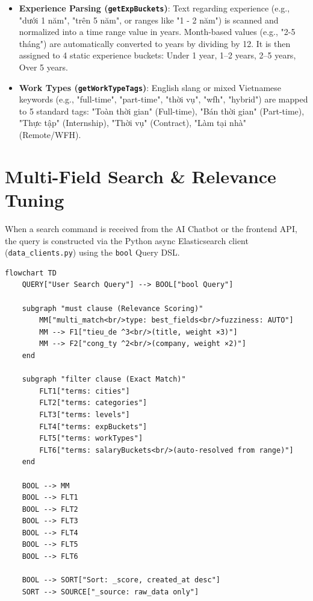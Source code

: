 \begin{itemize}
\item \textbf{Experience Parsing (\texttt{getExpBuckets})}: Text regarding experience (e.g., "dưới 1 năm", "trên 5 năm", or ranges like "1 - 2 năm") is scanned and normalized into a time range value in years. Month-based values (e.g., "2-5 tháng") are automatically converted to years by dividing by 12. It is then assigned to 4 static experience buckets: Under 1 year, 1–2 years, 2–5 years, Over 5 years.
\end{itemize}

\begin{itemize}
\item \textbf{Work Types (\texttt{getWorkTypeTags})}: English slang or mixed Vietnamese keywords (e.g., "full-time", "part-time", "thời vụ", "wfh", "hybrid") are mapped to 5 standard tags: "Toàn thời gian" (Full-time), "Bán thời gian" (Part-time), "Thực tập" (Internship), "Thời vụ" (Contract), "Làm tại nhà" (Remote/WFH).
\end{itemize}

\section{Multi-Field Search \& Relevance Tuning}

When a search command is received from the AI Chatbot or the frontend API, the query is constructed via the Python async Elasticsearch client (\texttt{data\_clients.py}) using the \texttt{bool} Query DSL.

\begin{verbatim}
flowchart TD
    QUERY["User Search Query"] --> BOOL["bool Query"]
    
    subgraph "must clause (Relevance Scoring)"
        MM["multi_match<br/>type: best_fields<br/>fuzziness: AUTO"]
        MM --> F1["tieu_de ^3<br/>(title, weight ×3)"]
        MM --> F2["cong_ty ^2<br/>(company, weight ×2)"]
    end
    
    subgraph "filter clause (Exact Match)"
        FLT1["terms: cities"]
        FLT2["terms: categories"]
        FLT3["terms: levels"]
        FLT4["terms: expBuckets"]
        FLT5["terms: workTypes"]
        FLT6["terms: salaryBuckets<br/>(auto-resolved from range)"]
    end
    
    BOOL --> MM
    BOOL --> FLT1
    BOOL --> FLT2
    BOOL --> FLT3
    BOOL --> FLT4
    BOOL --> FLT5
    BOOL --> FLT6
    
    BOOL --> SORT["Sort: _score, created_at desc"]
    SORT --> SOURCE["_source: raw_data only"]
\end{verbatim}

